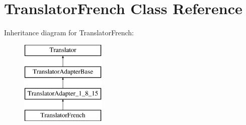 \hypertarget{class_translator_french}{}\section{Translator\+French Class Reference}
\label{class_translator_french}
Inheritance diagram for Translator\+French\+:\begin{figure}[H]
\begin{center}
\leavevmode
\includegraphics[height=4.000000cm]{class_translator_french}
\end{center}
\end{figure}
